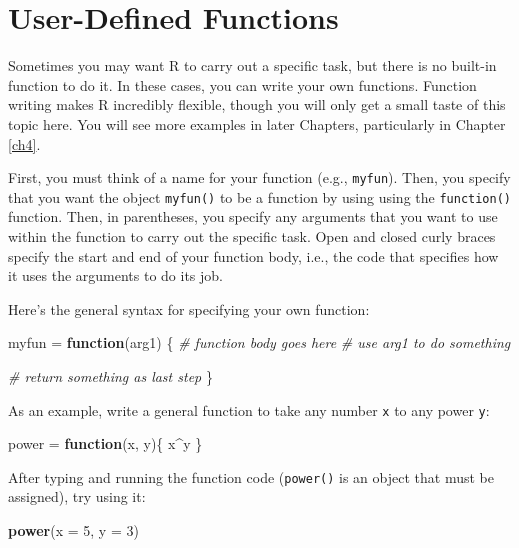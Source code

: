 \documentclass[]{book}
\newenvironment{Shaded}{\begin{snugshade}}{\end{snugshade}}
\newcommand{\CommentTok}[1]{\textcolor[rgb]{0.56,0.35,0.01}{\textit{#1}}}
\newcommand{\ControlFlowTok}[1]{\textcolor[rgb]{0.13,0.29,0.53}{\textbf{#1}}}
\newcommand{\DataTypeTok}[1]{\textcolor[rgb]{0.13,0.29,0.53}{#1}}
\newcommand{\DecValTok}[1]{\textcolor[rgb]{0.00,0.00,0.81}{#1}}
\newcommand{\KeywordTok}[1]{\textcolor[rgb]{0.13,0.29,0.53}{\textbf{#1}}}
\newcommand{\NormalTok}[1]{#1}
\newcommand{\OperatorTok}[1]{\textcolor[rgb]{0.81,0.36,0.00}{\textbf{#1}}}
\newcommand{\StringTok}[1]{\textcolor[rgb]{0.31,0.60,0.02}{#1}}
\begin{document}
\hypertarget{user-funcs}{%
\section{User-Defined Functions}\label{user-funcs}}

Sometimes you may want R to carry out a specific task, but there is no built-in function to do it. In these cases, you can write your own functions. Function writing makes R incredibly flexible, though you will only get a small taste of this topic here. You will see more examples in later Chapters, particularly in Chapter \ref{ch4}.

First, you must think of a name for your function (e.g., \texttt{myfun}). Then, you specify that you want the object \texttt{myfun()} to be a function by using using the \texttt{function()} function. Then, in parentheses, you specify any arguments that you want to use within the function to carry out the specific task. Open and closed curly braces specify the start and end of your function body, i.e., the code that specifies how it uses the arguments to do its job.

Here's the general syntax for specifying your own function:

\begin{Shaded}
\begin{Highlighting}[]
\NormalTok{myfun =}\StringTok{ }\ControlFlowTok{function}\NormalTok{(arg1) \{}
  \CommentTok{# function body goes here}
    \CommentTok{# use arg1 to do something}
  
  \CommentTok{# return something as last step}
\NormalTok{\}}
\end{Highlighting}
\end{Shaded}

As an example, write a general function to take any number \texttt{x} to any power \texttt{y}:

\begin{Shaded}
\begin{Highlighting}[]
\NormalTok{power =}\StringTok{ }\ControlFlowTok{function}\NormalTok{(x, y)\{}
\NormalTok{  x}\OperatorTok{^}\NormalTok{y}
\NormalTok{\}}
\end{Highlighting}
\end{Shaded}

After typing and running the function code (\texttt{power()} is an object that must be assigned), try using it:

\begin{Shaded}
\begin{Highlighting}[]
\KeywordTok{power}\NormalTok{(}\DataTypeTok{x =} \DecValTok{5}\NormalTok{, }\DataTypeTok{y =} \DecValTok{3}\NormalTok{)}
\end{Highlighting}
\end{Shaded}
\end{document}
